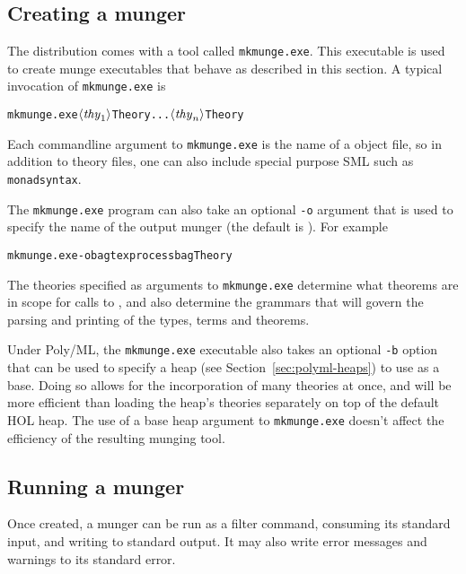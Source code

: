 \subsection{Creating a munger}
\label{sec:munger-creation}

\newcommand{\mkmunge}{\texttt{mkmunge.exe}}
%
The \HOL{} distribution comes with a tool called \mkmunge.
%
This executable is used to create munge executables that behave as described in this section.
%
A typical invocation of \mkmunge{} is
\begin{alltt}
   \mkmunge \(\langle\mathit{thy}\sb{1}\rangle\)Theory ... \(\langle\mathit{thy}\sb{n}\rangle\)Theory
\end{alltt}
Each commandline argument to \mkmunge{} is the name of a \HOL{} object file, so in addition to theory files, one can also include special purpose SML such as \texttt{monadsyntax}.

The \mkmunge{} program can also take an optional \texttt{-o} argument that is used to specify the name of the output munger (the default is \munge).  For example
\begin{alltt}
   \mkmunge -o bagtexprocess bagTheory
\end{alltt}

The theories specified as arguments to \mkmunge{} determine what theorems are in scope for calls to \holthm, and also determine the grammars that will govern the parsing and printing of the \HOL{} types, terms and theorems.

Under Poly/ML, the \mkmunge{} executable also takes an optional \texttt{-b} option that can be used to specify a heap (see Section~\ref{sec:polyml-heaps}) to use as a base.
Doing so allows for the incorporation of many theories at once, and will be more efficient than loading the heap's theories separately on top of the default HOL heap.
The use of a base heap argument to \mkmunge{} doesn't affect the efficiency of the resulting munging tool.


\subsection{Running a munger}
\label{sec:running-munger}

Once created, a munger can be run as a filter command, consuming its
standard input, and writing to standard output.
%
It may also write error messages and warnings to its standard error.

